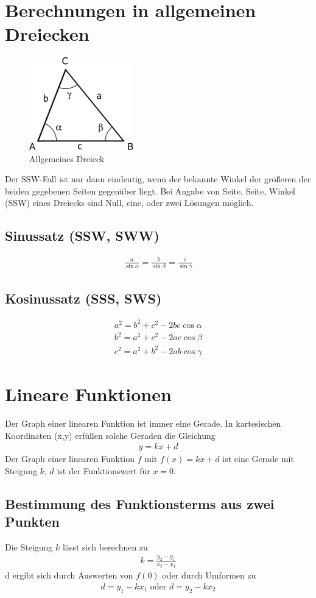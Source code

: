 \documentclass[a4paper]{article}
\begin{document}
\section{Berechnungen in allgemeinen Dreiecken}
\begin{figure}[h!]
\centering
\includegraphics[width=0.4\textwidth]{images/dreieck.png}
\caption{\label{fig:dreieck}{Allgemeines Dreieck}}
\end{figure}
Der SSW-Fall ist nur dann eindeutig, wenn der bekannte Winkel der größeren der beiden gegebenen Seiten gegenüber liegt. Bei Angabe von Seite, Seite, Winkel (SSW) eines Dreiecks sind Null, eine, oder zwei Lösungen möglich.
\subsection{Sinussatz (SSW, SWW)}
\begin{align*}
\frac{a}{\sin\alpha}=\frac{b}{\sin\beta}=\frac{c}{\sin\gamma}
\end{align*}
\subsection{Kosinussatz (SSS, SWS)}
\begin{align*}
a^{2}=b^{2}+c^{2}-2bc\cos\alpha \\
b^{2}=a^{2}+c^{2}-2ac\cos\beta \\
c^{2}=a^{2}+b^{2}-2ab\cos\gamma
\end{align*}

\section{Lineare Funktionen}
Der Graph einer linearen Funktion ist immer eine Gerade. In kartesischen Koordinaten (x,y) erfüllen solche Geraden die Gleichung
\begin{align*}
y=kx+d
\end{align*}
Der Graph einer linearen Funktion $f$ mit $f(x)=kx+d$ ist eine Gerade mit Steigung $k$, $d$ ist der Funktionswert für $x=0$.
\subsection{Bestimmung des Funktionsterms aus zwei Punkten}
Die Steigung $k$ lässt sich berechnen zu
\begin{align*}
k = \frac{y_{2}-y_{1}}{x_{2}-x_{1}}
\end{align*}
d ergibt sich durch Auswerten von $f(0)$ oder durch Umformen zu
\begin{align*}
d=y_{1}-kx_{1} \text{ oder } d=y_{2}-kx_{2}
\end{align*}
\end{document}
